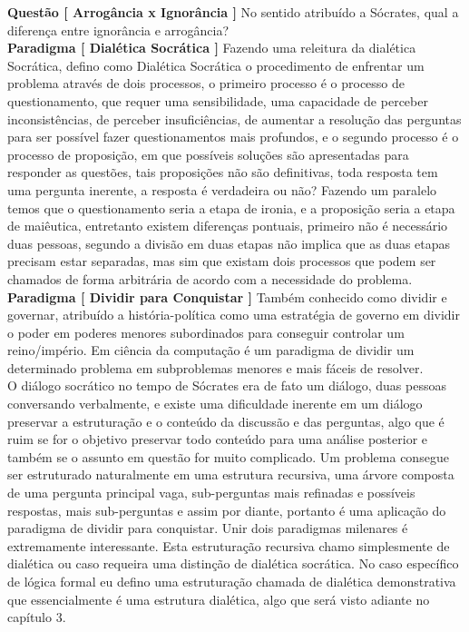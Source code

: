 \documentclass[10pt,a4paper]{report}
\begin{document}
\textbf{Questão [ Arrogância x Ignorância ]} No sentido atribuído a Sócrates, qual a diferença entre ignorância e arrogância? \\

\textbf{Paradigma [ Dialética Socrática ]} Fazendo uma releitura da dialética Socrática, defino como Dialética Socrática o procedimento de enfrentar um problema através de dois processos, o primeiro processo é o processo de questionamento, que requer uma sensibilidade, uma capacidade de perceber inconsistências, de perceber insuficiências, de aumentar a resolução das perguntas para ser possível fazer questionamentos mais profundos, e o segundo processo é o processo de proposição, em que possíveis soluções são apresentadas para responder as questões, tais proposições não são definitivas, toda resposta tem uma pergunta inerente, a resposta é verdadeira ou não? Fazendo um paralelo temos que o questionamento seria a etapa de ironia, e a proposição seria a etapa de maiêutica, entretanto existem diferenças pontuais, primeiro não é necessário duas pessoas, segundo a divisão em duas etapas não implica que as duas etapas precisam estar separadas, mas sim que existam dois processos que podem ser chamados de forma arbitrária de acordo com a necessidade do problema.\\

\textbf{Paradigma [ Dividir para Conquistar ]} Também conhecido como dividir e governar, atribuído a história-política como uma estratégia de governo em dividir o poder em poderes menores subordinados para conseguir controlar um reino/império. Em ciência da computação é um paradigma de dividir um determinado problema em subproblemas menores e mais fáceis de resolver.\\

O diálogo socrático no tempo de Sócrates era de fato um diálogo, duas pessoas conversando verbalmente, e existe uma dificuldade inerente em um diálogo preservar a estruturação e o conteúdo da discussão e das perguntas, algo que é ruim se for o objetivo preservar todo conteúdo para uma análise posterior e também se o assunto em questão for muito complicado. Um problema consegue ser estruturado naturalmente em uma estrutura recursiva, uma árvore composta de uma pergunta principal vaga, sub-perguntas mais refinadas e possíveis respostas, mais sub-perguntas e assim por diante, portanto é uma aplicação do paradigma de dividir para conquistar. Unir dois paradigmas milenares é extremamente interessante. Esta estruturação recursiva chamo simplesmente de dialética ou caso requeira uma distinção de dialética socrática. No caso específico de lógica formal eu defino uma estruturação chamada de dialética demonstrativa que essencialmente é uma estrutura dialética, algo que será visto adiante no capítulo 3. \\
\end{document}
